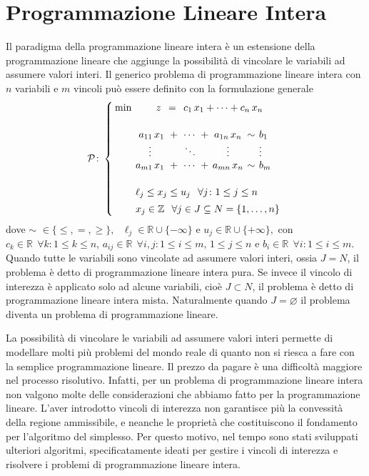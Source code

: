 \section{Programmazione Lineare Intera}
Il paradigma della programmazione lineare intera è un estensione della programmazione lineare che aggiunge la
possibilità di vincolare le variabili ad assumere valori interi. Il generico problema di programmazione lineare intera
con \( n \) variabili e \( m \) vincoli può essere definito con la formulazione generale
\begin{equation}
\mathcal{P}\colon
\setlength{\arraycolsep}{2pt}
\left\{\begin{array}{rrcccccl}
\min & z\,\, &=\,\,& \multicolumn{5}{l}{c_{1}\,x_{1}+\cdots+c_{n}\,x_{n}} \\[15pt]
     &  a_{11}\,x_{1} &+ &\cdots &+ &a_{1n}\,x_{n} &\sim &b_{1}       \\
     & \multicolumn{1}{c}{\vdots} &&\ddots&&\vdots&& \vdots           \\
     &  a_{m1}\,x_{1} &+ &\cdots &+ &a_{mn}\,x_{n} &\sim &b_{m}       \\[15pt]
     & \multicolumn{7}{l}{\ell_j \le x_{j} \le u_{j} \;\;\, \forall j\colon 1 \le j \le n} \\[5pt]
     & \multicolumn{7}{l}{x_j \in \mathbb{Z} \;\;\, \forall j \in J \subseteq N = \{ 1, \ldots, n \}}
\end{array}\right.\\[10pt]
\end{equation}
dove
\(
\sim \,\,\in \{ \leq, =, \geq \}, \text{ } \ell_j \in \mathbb{R} \cup \{-\infty\} \text{ e } u_j \in \mathbb{R} \cup
\{+\infty\},
\)
con \( c_k \in \mathbb{R} \;\, \forall k\colon 1 \leq k \leq n \), \( a_{ij} \in \mathbb{R} \;\, \forall i,j\colon 1
\leq i \leq m,\, 1 \leq j \leq n \) e \( b_i \in \mathbb{R}\;\, \forall i\colon 1 \leq i \leq m \).
Quando tutte le variabili sono vincolate ad assumere valori interi, ossia \( J = N \), il problema è detto di
programmazione lineare intera pura. Se invece il vincolo di interezza è applicato solo ad alcune variabili, cioè \( J
\subset N \), il problema è detto di programmazione lineare intera mista. Naturalmente quando \( J = \varnothing \) il
problema diventa un problema di programmazione lineare.

La possibilità di vincolare le variabili ad assumere valori interi permette di modellare molti più problemi del mondo
reale di quanto non si riesca a fare con la semplice programmazione lineare. Il prezzo da pagare è una difficoltà
maggiore nel processo risolutivo. Infatti, per un problema di programmazione lineare intera non valgono molte delle
considerazioni che abbiamo fatto per la programmazione lineare. L'aver introdotto vincoli di interezza non
garantisce più la convessità della regione ammissibile, e neanche le proprietà che costituiscono il fondamento per
l'algoritmo del simplesso. Per questo motivo, nel tempo sono stati sviluppati ulteriori algoritmi, specificatamente
ideati per gestire i vincoli di interezza e risolvere i problemi di programmazione lineare intera.

